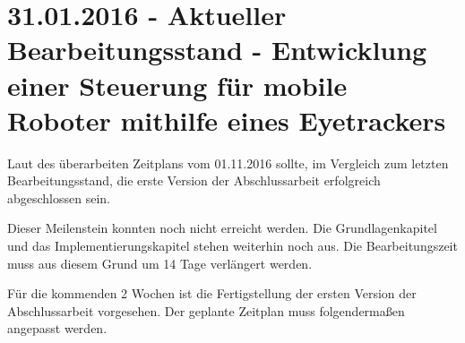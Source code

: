 \documentclass[11pt,a4paper,onecolumn,twoside,ngerman]{book}
\begin{document}
\section*{31.01.2016 - Aktueller Bearbeitungsstand - Entwicklung einer Steuerung für mobile Roboter mithilfe eines Eyetrackers}

Laut des überarbeiten Zeitplans vom 01.11.2016 sollte, im Vergleich zum letzten Bearbeitungsstand, die erste Version der Abschlussarbeit erfolgreich abgeschlossen sein. 

Dieser Meilenstein konnten noch nicht erreicht werden. Die Grundlagenkapitel und das Implementierungskapitel stehen weiterhin noch aus. Die Bearbeitungszeit muss aus diesem Grund um 14 Tage verlängert werden.

Für die kommenden 2 Wochen ist die Fertigstellung der ersten Version der Abschlussarbeit vorgesehen. Der geplante Zeitplan muss folgendermaßen angepasst werden.
\end{document}
